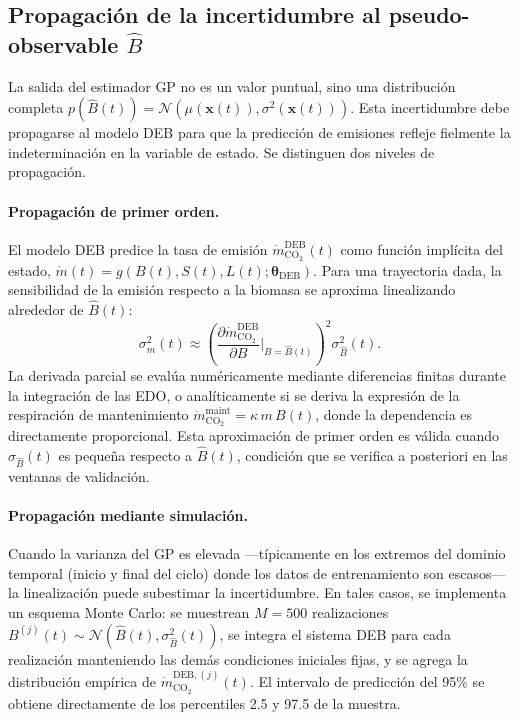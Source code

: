 \subsection{Propagación de la incertidumbre al pseudo-observable $\hat{B}$}
\label{subsec:cap4_gp_propagacion}

La salida del estimador GP no es un valor puntual, sino una distribución completa $p(\hat{B}(t)) = \mathcal{N}(\mu(\mathbf{x}(t)), \sigma^{2}(\mathbf{x}(t)))$. Esta incertidumbre debe propagarse al modelo DEB para que la predicción de emisiones refleje fielmente la indeterminación en la variable de estado. Se distinguen dos niveles de propagación.

\paragraph{Propagación de primer orden.}
El modelo DEB predice la tasa de emisión $\dot{m}_{\mathrm{CO_2}}^{\mathrm{DEB}}(t)$ como función implícita del estado, $\dot{m}(t) = g(B(t), S(t), L(t); \boldsymbol{\theta}_{\mathrm{DEB}})$. Para una trayectoria dada, la sensibilidad de la emisión respecto a la biomasa se aproxima linealizando alrededor de $\hat{B}(t)$:
\begin{equation}
    \label{eq:cap4_propagacion_lineal}
    \sigma^{2}_{\dot{m}}(t) \approx
    \left(
    \frac{\partial \dot{m}_{\mathrm{CO_2}}^{\mathrm{DEB}}}{\partial B}
    \Big|_{B=\hat{B}(t)}
    \right)^{\!2}
    \sigma^{2}_{\hat{B}}(t).
\end{equation}
La derivada parcial se evalúa numéricamente mediante diferencias finitas durante la integración de las EDO, o analíticamente si se deriva la expresión de la respiración de mantenimiento $\dot{m}_{\mathrm{CO_2}}^{\mathrm{maint}} = \kappa\,m\,B(t)$, donde la dependencia es directamente proporcional. Esta aproximación de primer orden es válida cuando $\sigma_{\hat{B}}(t)$ es pequeña respecto a $\hat{B}(t)$, condición que se verifica a posteriori en las ventanas de validación.

\paragraph{Propagación mediante simulación.}
Cuando la varianza del GP es elevada —típicamente en los extremos del dominio temporal (inicio y final del ciclo) donde los datos de entrenamiento son escasos— la linealización puede subestimar la incertidumbre. En tales casos, se implementa un esquema Monte Carlo: se muestrean $M = \num{500}$ realizaciones $B^{(j)}(t) \sim \mathcal{N}(\hat{B}(t), \sigma^{2}_{\hat{B}}(t))$, se integra el sistema DEB para cada realización manteniendo las demás condiciones iniciales fijas, y se agrega la distribución empírica de $\dot{m}_{\mathrm{CO_2}}^{\mathrm{DEB},(j)}(t)$. El intervalo de predicción del \num{95}\% se obtiene directamente de los percentiles \num{2.5} y \num{97.5} de la muestra.

